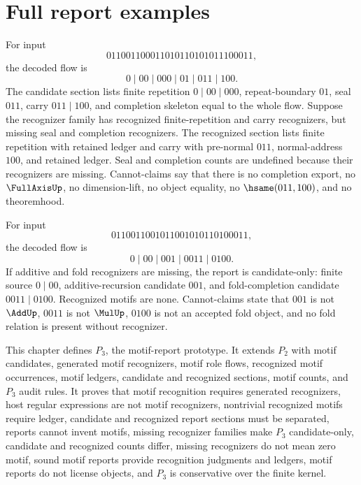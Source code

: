 \section{Full report examples}
\label{sec:motif-report-full-examples}

\begin{example}
\label{ex:motif-report-full-completion}
For input
$$
  011001100011010110101011100011,
$$
the decoded flow is
$$
  0\mid 00\mid 000\mid 01\mid 011\mid 100.
$$
The candidate section lists finite repetition $0\mid 00\mid 000$, repeat-boundary $01$, seal $011$, carry $011\mid 100$, and completion skeleton equal to the whole flow. Suppose the recognizer family has recognized finite-repetition and carry recognizers, but missing seal and completion recognizers. The recognized section lists finite repetition with retained ledger and carry with pre-normal $011$, normal-address $100$, and retained ledger. Seal and completion counts are undefined because their recognizers are missing. Cannot-claims say that there is no completion export, no $\FullAxisUp$, no dimension-lift, no object equality, no $\hsame(011,100)$, and no theoremhood.
\end{example}

\begin{example}
\label{ex:motif-report-full-fold}
For input
$$
  0110011001011001010110100011,
$$
the decoded flow is
$$
  0\mid 00\mid 001\mid 0011\mid 0100.
$$
If additive and fold recognizers are missing, the report is candidate-only: finite source $0\mid 00$, additive-recursion candidate $001$, and fold-completion candidate $0011\mid 0100$. Recognized motifs are none. Cannot-claims state that $001$ is not $\AddUp$, $0011$ is not $\MulUp$, $0100$ is not an accepted fold object, and no fold relation is present without recognizer.
\end{example}

\begin{remark}[Summary]
\label{rem:motif-report-summary}
This chapter defines $P_3$, the motif-report prototype. It extends $P_2$ with motif candidates, generated motif recognizers, motif role flows, recognized motif occurrences, motif ledgers, candidate and recognized sections, motif counts, and $P_3$ audit rules. It proves that motif recognition requires generated recognizers, host regular expressions are not motif recognizers, nontrivial recognized motifs require ledger, candidate and recognized report sections must be separated, reports cannot invent motifs, missing recognizer families make $P_3$ candidate-only, candidate and recognized counts differ, missing recognizers do not mean zero motif, sound motif reports provide recognition judgments and ledgers, motif reports do not license objects, and $P_3$ is conservative over the finite kernel.
\end{remark}

